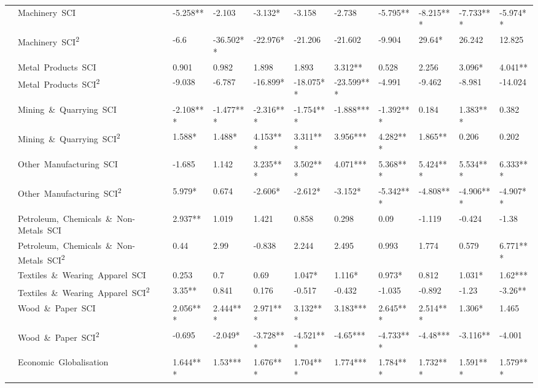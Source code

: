 \documentclass[10pt]{article}
\begin{document}
\begin{table}[H]
\begin{adjustbox}{width=\textwidth,center}
\begin{tabular}{lllllllllll}
      & Machinery\ SCI & -5.258** & -2.103 & -3.132* & -3.158 & -2.738 & -5.795** & -8.215*** & -7.733*** & -5.974** \\
      & Machinery\ SCI\textsuperscript{2} & -6.6 & -36.502** & -22.976* & -21.206 & -21.602 & -9.904 & 29.64* & 26.242 & 12.825 \\
      & Metal\ Products\ SCI & 0.901 & 0.982 & 1.898 & 1.893 & 3.312** & 0.528 & 2.256 & 3.096* & 4.041** \\
      & Metal\ Products\ SCI\textsuperscript{2} & -9.038 & -6.787 & -16.899* & -18.075** & -23.599*** & -4.991 & -9.462 & -8.981 & -14.024 \\
      & Mining\ \&\ Quarrying\ SCI & -2.108*** & -1.477*** & -2.316*** & -1.754*** & -1.888*** & -1.392*** & 0.184 & 1.383*** & 0.382 \\
      & Mining\ \&\ Quarrying\ SCI\textsuperscript{2} & 1.588* & 1.488* & 4.153*** & 3.311*** & 3.956*** & 4.282*** & 1.865** & 0.206 & 0.202 \\
      & Other\ Manufacturing\ SCI & -1.685 & 1.142 & 3.235*** & 3.502*** & 4.071*** & 5.368*** & 5.424*** & 5.534*** & 6.333*** \\
      & Other\ Manufacturing\ SCI\textsuperscript{2} & 5.979* & 0.674 & -2.606* & -2.612* & -3.152* & -5.342*** & -4.808** & -4.906*** & -4.907** \\
      & Petroleum,\ Chemicals\ \&\ Non-Metals\ SCI & 2.937** & 1.019 & 1.421 & 0.858 & 0.298 & 0.09 & -1.119 & -0.424 & -1.38 \\
      & Petroleum,\ Chemicals\ \&\ Non-Metals\ SCI\textsuperscript{2} & 0.44 & 2.99 & -0.838 & 2.244 & 2.495 & 0.993 & 1.774 & 0.579 & 6.771*** \\
      & Textiles\ \&\ Wearing\ Apparel\ SCI & 0.253 & 0.7 & 0.69 & 1.047* & 1.116* & 0.973* & 0.812 & 1.031* & 1.62*** \\
      & Textiles\ \&\ Wearing\ Apparel\ SCI\textsuperscript{2} & 3.35** & 0.841 & 0.176 & -0.517 & -0.432 & -1.035 & -0.892 & -1.23 & -3.26** \\
      & Wood\ \&\ Paper\ SCI & 2.056*** & 2.444*** & 2.971*** & 3.132*** & 3.183*** & 2.645*** & 2.514*** & 1.306* & 1.465 \\
      & Wood\ \&\ Paper\ SCI\textsuperscript{2} & -0.695 & -2.049* & -3.728*** & -4.521*** & -4.65*** & -4.733*** & -4.48*** & -3.116** & -4.001 \\
      & Economic\ Globalisation & 1.644*** & 1.53*** & 1.676*** & 1.704*** & 1.774*** & 1.784*** & 1.732*** & 1.591*** & 1.579*** \\

\end{tabular}
\end{adjustbox}
\end{table}
\end{document}
